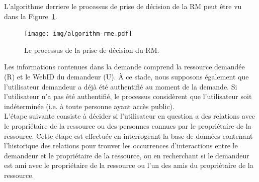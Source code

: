L'algorithme derriere le processus de prise de décision de la RM peut être vu dans la Figure~\ref{fig:algorithm_rme_fr}.\\

\begin{figure}[h]
  \begin{center}
    \texttt{[image: img/algorithm-rme.pdf]}
        \caption{Le processus de la prise de décision du RM.}
        \label{fig:algorithm_rme_fr}
  \end{center}
\end{figure}

Les informations contenues dans la demande comprend la ressource demandée (R) et le WebID du demandeur (U). À ce stade, nous supposons également que l'utilisateur demandeur a déjà été authentifié au moment de la demande. Si l'utilisateur n'a pas été authentifié, le processus considèrent que l'utilisateur soit indéterminée (i.e. à toute personne ayant accès public).\\


L'étape suivante consiste à décider si l'utilisateur en question a des relations avec le propriétaire de la ressource ou des personnes connues par le propriétaire de la ressource. Cette étape est effectuée en interrogeant la base de données contenant l'historique des relations pour trouver les occurrences d'interactions entre le demandeur et le propriétaire de la ressource, ou en recherchant si le demandeur est ami avec le propriétaire de la ressource ou l'un des amis du propriétaire de la ressource.\\


